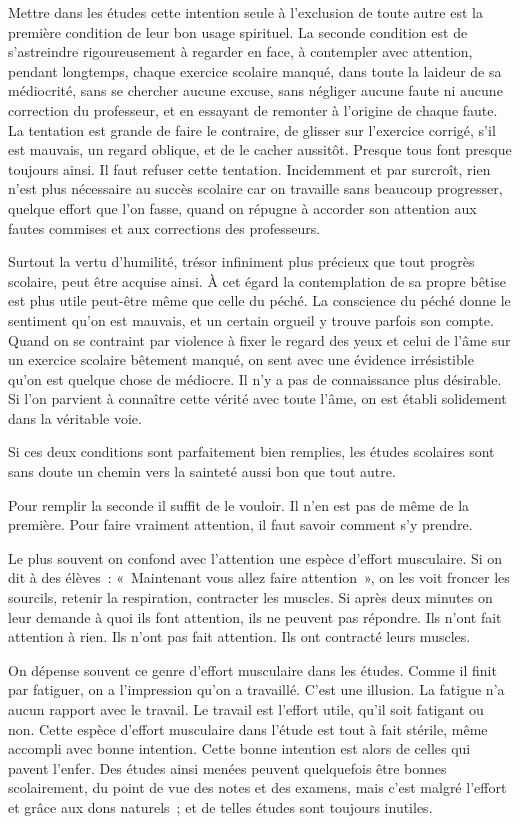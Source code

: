 \documentclass[french,twoside]{book} %
\begin{document}
Mettre dans les études cette intention seule à l'exclusion de toute autre est la première condition de leur bon usage spirituel. La seconde condition est de s'astreindre rigoureusement à regarder en face, à contempler avec attention, pendant longtemps, chaque exercice scolaire manqué, dans toute la laideur de sa médiocrité, sans se chercher aucune excuse, sans négliger aucune faute ni aucune correction du professeur, et en essayant de remonter à l'origine de chaque faute. La tentation est grande de faire le contraire, de glisser sur l'exercice corrigé, s'il est mauvais, un regard oblique, et de le cacher aussitôt. Presque tous font presque toujours ainsi. Il faut refuser cette tentation. Incidemment et par surcroît, rien n'est plus nécessaire au succès scolaire car on travaille sans beaucoup progresser, quelque effort que l'on fasse, quand on répugne à accorder son attention aux fautes commises et aux corrections des professeurs.\par
Surtout la vertu d'humilité, trésor infiniment plus précieux que tout progrès scolaire, peut être acquise ainsi. À cet égard la contemplation de sa propre bêtise est plus utile peut-être même que celle du péché. La conscience du péché donne le sentiment qu'on est mauvais, et un certain orgueil y trouve parfois son compte. Quand on se contraint par violence à fixer le regard des yeux et celui de l'âme sur un exercice scolaire bêtement manqué, on sent avec une évidence irrésistible qu'on est quelque chose de médiocre. Il n'y a pas de connaissance plus désirable. Si l'on parvient à connaître cette vérité avec toute l'âme, on est établi solidement dans la véritable voie.\par
Si ces deux conditions sont parfaitement bien remplies, les études scolaires sont sans doute un chemin vers la sainteté aussi bon que tout autre.\par
Pour remplir la seconde il suffit de le vouloir. Il n'en est pas de même de la première. Pour faire vraiment attention, il faut savoir comment s'y prendre.\par
Le plus souvent on confond avec l'attention une espèce d'effort musculaire. Si on dit à des élèves : « Maintenant vous allez faire attention », on les voit froncer les sourcils, retenir la respiration, contracter les muscles. Si après deux minutes on leur demande à quoi ils font attention, ils ne peuvent pas répondre. Ils n'ont fait attention à rien. Ils n'ont pas fait attention. Ils ont contracté leurs muscles.\par
On dépense souvent ce genre d'effort musculaire dans les études. Comme il finit par fatiguer, on a l'impression qu'on a travaillé. C'est une illusion. La fatigue n'a aucun rapport avec le travail. Le travail est l'effort utile, qu'il soit fatigant ou non. Cette espèce d'effort musculaire dans l'étude est tout à fait stérile, même accompli avec bonne intention. Cette bonne intention est alors de celles qui pavent l'enfer. Des études ainsi menées peuvent quelquefois être bonnes scolairement, du point de vue des notes et des examens, mais c'est malgré l'effort et grâce aux dons naturels ; et de telles études sont toujours inutiles.\par
\end{document}
